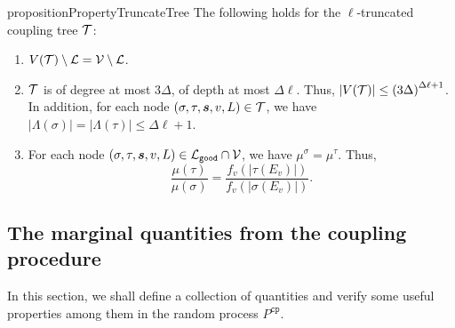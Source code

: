 \documentclass[11pt]{article}
\newtheorem{lemma}[theorem]{Lemma}
\newtheorem{corollary}[theorem]{Corollary}
\newcommand{\abs}[1]{\left\vert#1\right\vert}
\def\!#1{\mathtt{#1}}
\newcommand{\seqS}{\boldsymbol{s}}
\newcommand{\qtodo}[1]{\todo[color = purple!40, size = \tiny]{\textbf{guoliang:} #1}}
\newcommand{\qgl}[1]{{\color{purple}{#1}}}
\newcommand{\hktodo}[1]{{\color{blue}{#1}}}
\begin{document}
\begin{restatable}{proposition}{PropertyTruncateTree} \label{prop:property-of-truncated-tree}
The following holds for the $\ell$-truncated coupling tree $\mathcal{T}$:
\begin{enumerate}[(1)]
\item $V(\mathcal{T})\setminus \mathcal{L} = \mathcal{V}\setminus\mathcal{L}$. \label{item:CT-property-1}
\item $\mathcal{T}$ is of degree at most $3\Delta$, of depth at most $\Delta \ell$.
Thus, $\abs{V(\+T)}\leq \left(3\Delta\right)^{\Delta \ell + 1}$.
In addition, for each node $(\sigma,\tau,\seqS,v,L)\in \+T$, we have $\abs{\Lambda(\sigma)} = \abs{\Lambda(\tau)} \leq \Delta \ell + 1$. \label{item:CT-property-size}
\item For each node $(\sigma,\tau,\seqS,v,L)\in \+L_{\!{good}}\cap \+V$, we have $\mu^\sigma = \mu^\tau$. Thus, 
\[\frac{\mu(\tau)}{\mu(\sigma)} =  \frac{f_v\left(\abs{\tau(E_v)}\right)}{f_v\left(\abs{\sigma({E_v})}\right)}.\] \label{item:CT-property-ratio}
\end{enumerate}
\end{restatable}






%
%

\subsection{The marginal quantities from the coupling procedure}
\hktodo{polish the following paragraph}
In this section, we shall define a collection of quantities and verify some useful properties among them in the random process $P^{\!{cp}}$. 
\end{document}
